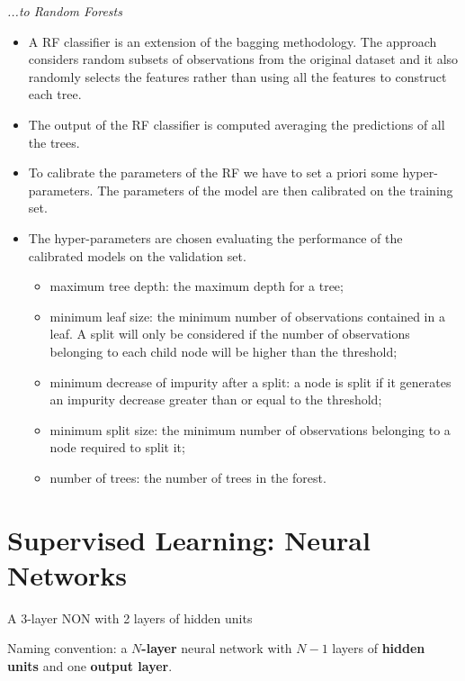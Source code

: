 \textit{...to Random Forests}
\begin{itemize}
    \item A RF classifier is an extension of the bagging methodology. The approach considers random subsets of observations from the original dataset and it also randomly selects the features rather than using all the features to construct each tree.
    \item The output of the RF classifier is computed averaging the predictions of all the trees.
\end{itemize}

\begin{itemize}
    \item To calibrate the parameters of the RF we have to set a priori some hyper-parameters. The parameters of the model are then calibrated on the training set.
    \item The hyper-parameters are chosen evaluating the performance of the calibrated models on the validation set. 
          \begin{itemize}
              \item maximum tree depth: the maximum depth for a tree; 
              \item minimum leaf size: the minimum number of observations contained in a leaf. A split will only be considered if the number of observations belonging to each child node will be higher than the threshold;
              \item minimum decrease of impurity after a split: a node is split if it generates an impurity decrease greater than or equal to the threshold;
              \item minimum split size: the minimum number of observations belonging to a node required to split it;
              \item number of trees: the number of trees in the forest.
          \end{itemize}
\end{itemize}
\section{Supervised Learning: Neural Networks}

A 3-layer NON with 2 layers of hidden units


Naming convention: a $N$\textbf{-layer} neural network with $N-1$ layers of \textbf{hidden units} and one \textbf{output layer}.

